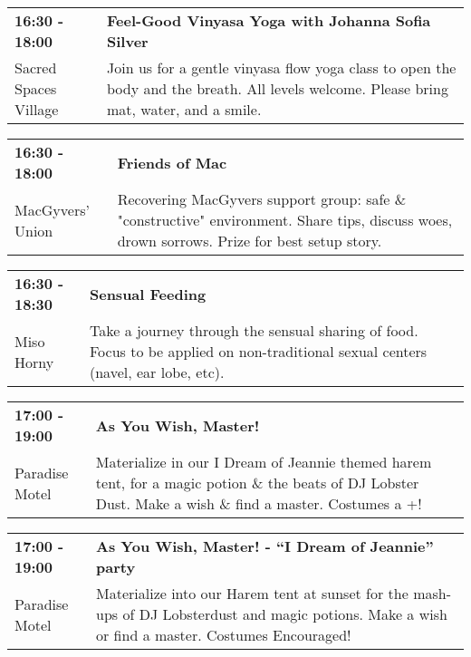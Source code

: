 \begin{tabular}{ p{1in} p{2.2in} }
    \textbf{16:30 - 18:00} & \textbf{Feel-Good Vinyasa Yoga with Johanna Sofia Silver} \\
    Sacred Spaces Village \newline  & Join us for a gentle vinyasa flow yoga class to open the body and the breath. All levels welcome. Please bring mat, water, and a smile. \\
    \hline 
\end{tabular}
    
\begin{tabular}{ p{1in} p{2.2in} }
    \textbf{16:30 - 18:00} & \textbf{Friends of Mac} \\
    MacGyvers' Union \newline  & Recovering MacGyvers support group: safe \& "constructive" environment. Share tips, discuss woes, drown sorrows. Prize for best setup story. \\
    \hline 
\end{tabular}
    
\begin{tabular}{ p{1in} p{2.2in} }
    \textbf{16:30 - 18:30} & \textbf{Sensual Feeding} \\
    Miso Horny \newline  & Take a journey through the sensual sharing of food. Focus to be applied on non-traditional sexual centers (navel, ear lobe, etc). \\
    \hline 
\end{tabular}
    
\begin{tabular}{ p{1in} p{2.2in} }
    \textbf{17:00 - 19:00} & \textbf{As You Wish, Master!} \\
    Paradise Motel \newline  & Materialize in our I Dream of Jeannie themed harem tent, for a magic potion \& the beats of DJ Lobster Dust. Make a wish \& find a master. Costumes a +! \\
    \hline 
\end{tabular}
    
\begin{tabular}{ p{1in} p{2.2in} }
    \textbf{17:00 - 19:00} & \textbf{As You Wish, Master! - ``I Dream of Jeannie'' party} \\
    Paradise Motel \newline  & Materialize into our Harem tent at sunset for the mash-ups of DJ Lobsterdust and magic potions. Make a wish or find a master. Costumes Encouraged! \\
    \hline 
\end{tabular}
    
